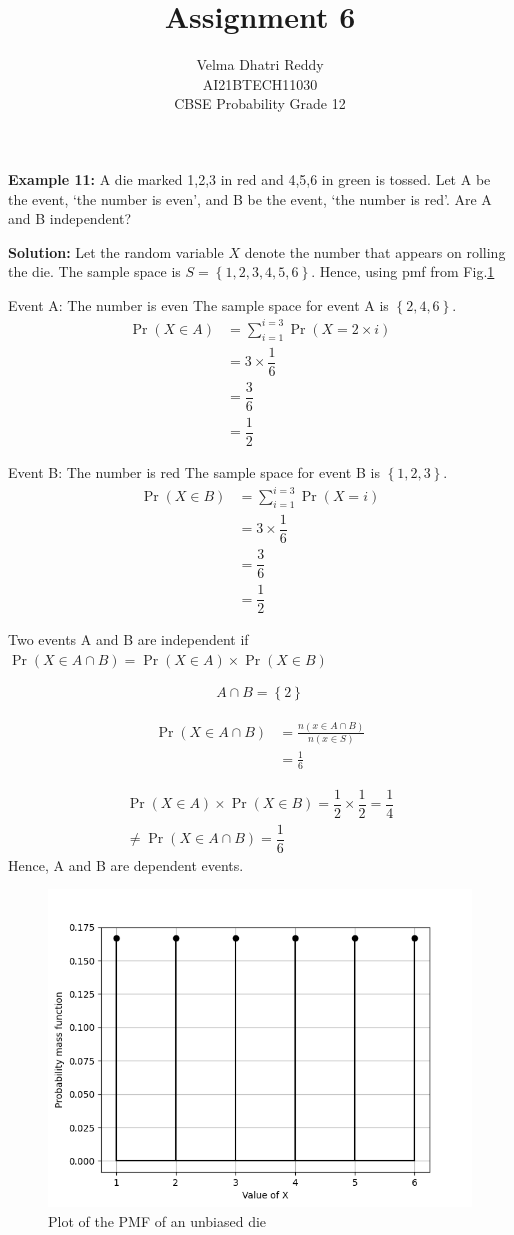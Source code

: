 \documentclass[journal,11pt,twocolumn]{IEEEtran}
\title{Assignment 6}
\author{Velma Dhatri Reddy \\ \normalsize AI21BTECH11030 \\ \vspace*{10pt} \Large CBSE Probability Grade 12}
\providecommand{\pr}[1]{\ensuremath{\Pr\left(#1\right)}}
\providecommand{\cbrak}[1]{\ensuremath{\left\{#1\right\}}}
\providecommand{\brak}[1]{\ensuremath{\left(#1\right)}}
\begin{document}
\maketitle
\textbf{Example 11:}
A die marked 1,2,3 in red and 4,5,6 in green is tossed. Let A be the event, ‘the number is even’, and B be the event, ‘the number is red’. Are A and B independent?

\textbf{Solution:} Let the random variable $X$ denote the number that appears on rolling the die. The sample space is $S = \cbrak{1, 2, 3, 4, 5, 6}$.
Hence, using pmf from Fig.\ref{fig:pmf}

Event A: The number is even
The sample space for event A is \cbrak{2,4,6}.
\begin{align}
    \pr{X \in A}&= \sum_{i = 1}^{i = 3}\pr{X = 2\times i}\\
    &= 3\times \dfrac{1}{6}\\
    &= \dfrac{3}{6}\\
    &= \dfrac{1}{2}
\end{align}

Event B: The number is red
The sample space for event B is \cbrak{1,2,3}.
\begin{align}
    \pr{X \in B}&= \sum_{i = 1}^{i = 3}\pr{X = i}\\
    &= 3\times \dfrac{1}{6}\\
    &= \dfrac{3}{6}\\
    &= \dfrac{1}{2}
\end{align}

Two events A and B are independent if 
$\pr{X \in A \cap B } = \pr{X \in A}\times\pr{X \in B}$

\begin{align}
    A \cap B = \cbrak{2}
\end{align}
    
\begin{align}
    \pr{X \in A \cap B} &= \frac{n\brak{x \in A \cap B}}{n\brak{x \in S}}\\
    &= \frac{1}{6}
\end{align}

\begin{multline}
    \pr{X \in A}\times\pr{X \in B} = \dfrac{1}{2}\times\dfrac{1}{2} = \dfrac{1}{4}\\
    \neq \pr{X \in A \cap B } = \dfrac{1}{6}
\end{multline}
Hence, A and B are dependent events.

\begin{figure}[!ht]
\centering
\includegraphics[width=\columnwidth]{figs/pmf.png}
\caption{Plot of the PMF of an unbiased die}
\label{fig:pmf}
\end{figure}
\end{document}
